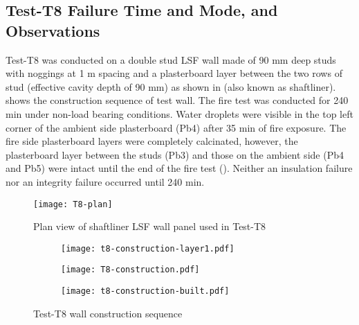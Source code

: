 \subsection{Test-T8 Failure Time and Mode, and Observations}

Test-T8 was conducted on a double stud LSF wall made of 90 mm deep studs with noggings at 1 m spacing and a plasterboard layer between the two rows of stud (effective cavity depth of 90 mm) as shown in  (also known as shaftliner).  shows the construction sequence of test wall. The fire test was conducted for 240 min under non-load bearing conditions. Water droplets were visible in the top left corner of the ambient side plasterboard (Pb4) after 35 min of fire exposure. The fire side plasterboard layers were completely calcinated, however, the plasterboard layer between the studs (Pb3) and those on the ambient side (Pb4 and Pb5) were intact until the end of the fire test (). Neither an insulation failure nor an integrity failure occurred until 240 min. 
\begin{figure}[!htbp]
	\centering
		\texttt{[image: T8-plan]}
		\caption{Plan view of shaftliner LSF wall panel used in Test-T8}
		\label{fig:T8-plan}
\end{figure}
\begin{figure}[!htbp]
	\centering
	\begin{subfigure}[b]{0.55\textwidth}
		\centering
		\texttt{[image: t8-construction-layer1.pdf]}
		\caption{}
		\label{subfig:t8-construction-layer1}
	\end{subfigure}
	\begin{subfigure}[b]{0.55\textwidth}
		\centering
		\texttt{[image: T8-construction.pdf]}
		\caption{}
		\label{subfig:T8-construction}
	\end{subfigure}
	\begin{subfigure}[b]{0.55\textwidth}
		\centering
		\texttt{[image: t8-construction-built.pdf]}
		\caption{}
		\label{subfig:t8-construction-built}
	\end{subfigure}
	   \caption{Test-T8 wall construction sequence}
	   \label{fig:t8-construction-sequence}
\end{figure}
